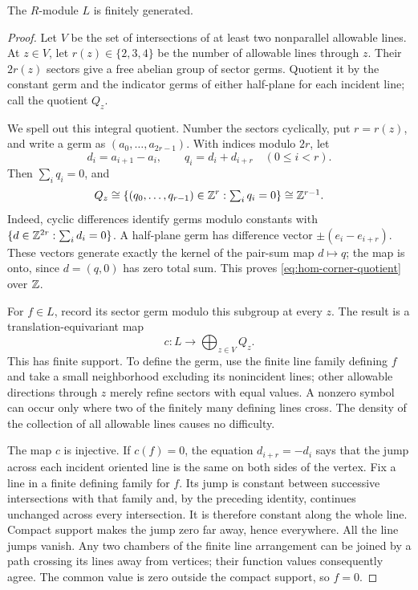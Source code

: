 \begin{lemma}\label{lem:hom-corner-module}
The $R$-module $L$ is finitely generated.
\end{lemma}

\begin{proof}
Let $V$ be the set of intersections of at least two nonparallel
allowable lines.  At $z\in V$, let $r(z)\in\{2,3,4\}$ be the
number of allowable lines through $z$.  Their $2r(z)$ sectors
give a free abelian group of sector germs.  Quotient it by the
constant germ and the indicator germs of either half-plane for
each incident line; call the quotient $Q_z$.

We spell out this integral quotient.  Number the sectors
cyclically, put $r=r(z)$, and write a germ as
$(a_0,\ldots,a_{2r-1})$.  With indices modulo $2r$, let
\[
 d_i=a_{i+1}-a_i,\qquad q_i=d_i+d_{i+r}\quad(0\leq i<r).
\]
Then $\sum_iq_i=0$, and
\begin{equation}\label{eq:hom-corner-quotient}
 Q_z\cong\{(q_0,\ldots,q_{r-1})\in\mathbb Z^r:\textstyle\sum_iq_i=0\}
       \cong\mathbb Z^{r-1}.
\end{equation}
Indeed, cyclic differences identify germs modulo constants with
$\{d\in\mathbb Z^{2r}:\sum_i d_i=0\}$.  A half-plane germ has
difference vector $\pm(e_i-e_{i+r})$.  These vectors generate
exactly the kernel of the pair-sum map $d\mapsto q$; the map is
onto, since $d=(q,0)$ has zero total sum.  This proves
\eqref{eq:hom-corner-quotient} over $\mathbb Z$.

For $f\in L$, record its sector germ modulo this subgroup at
every $z$.  The result is a translation-equivariant map
\[
 c:L\longrightarrow\bigoplus_{z\in V}Q_z.
\]
This has finite support.  To define the germ, use the finite line
family defining $f$ and take a small neighborhood excluding its
nonincident lines; other allowable directions through $z$
merely refine sectors with equal values.  A nonzero symbol can
occur only where two of the finitely many defining lines cross.
The density of the collection of all allowable lines causes no
difficulty.

The map $c$ is injective.  If $c(f)=0$, the equation
$d_{i+r}=-d_i$ says that the jump across each incident oriented
line is the same on both sides of the vertex.  Fix a line in a
finite defining family for $f$.  Its jump is constant between
successive intersections with that family and, by the preceding
identity, continues unchanged across every intersection.  It is
therefore constant along the whole line.  Compact support makes
the jump zero far away, hence everywhere.  All the line jumps
vanish.  Any two chambers of the finite line arrangement can be
joined by a path crossing its lines away from vertices; their
function values consequently agree.  The common value is zero
outside the compact support, so $f=0$.


\end{proof}
